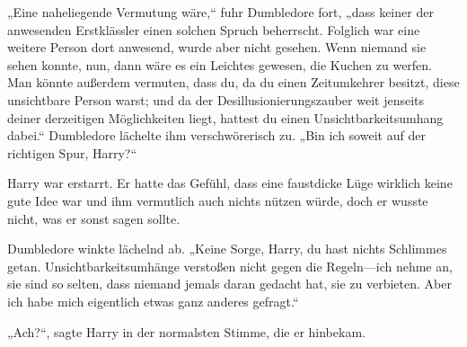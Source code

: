 „Eine naheliegende Vermutung wäre,“ fuhr Dumbledore fort, „dass keiner der anwesenden Erstklässler einen solchen Spruch beherrscht. Folglich war eine weitere Person dort anwesend, wurde aber nicht gesehen. Wenn niemand sie sehen konnte, nun, dann wäre es ein Leichtes gewesen, die Kuchen zu werfen. Man könnte außerdem vermuten, dass du, da du einen Zeitumkehrer besitzt, diese unsichtbare Person warst; und da der Desillusionierungszauber weit jenseits deiner derzeitigen Möglichkeiten liegt, hattest du einen Unsichtbarkeitsumhang dabei.“ Dumbledore lächelte ihm verschwörerisch zu. „Bin ich soweit auf der richtigen Spur, Harry?“

Harry war erstarrt. Er hatte das Gefühl, dass eine faustdicke Lüge wirklich keine gute Idee war und ihm vermutlich auch nichts nützen würde, doch er wusste nicht, was er sonst sagen sollte.

Dumbledore winkte lächelnd ab. „Keine Sorge, Harry, du hast nichts Schlimmes getan. Unsichtbarkeitsumhänge verstoßen nicht gegen die Regeln—ich nehme an, sie sind so selten, dass niemand jemals daran gedacht hat, sie zu verbieten. Aber ich habe mich eigentlich etwas ganz anderes gefragt.“

„Ach?“, sagte Harry in der normalsten Stimme, die er hinbekam.

